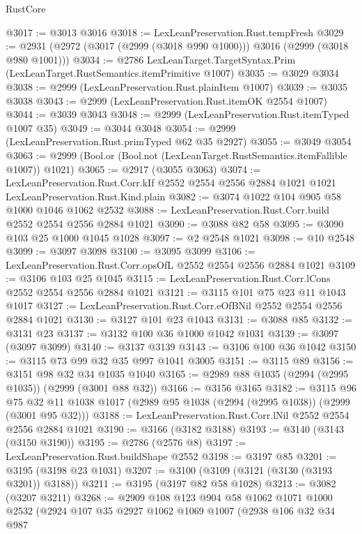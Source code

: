 \begin{lexlean}{RustCore}
\begin{coremodule}
@3017 := @3013 @3016
@3018 := LexLeanPreservation.Rust.tempFresh
@3029 := @2931 (@2972 (@3017 (@2999 (@3018 @990 @1000))) @3016 (@2999 (@3018 @980 @1001)))
@3034 := @2786 LexLeanTarget.TargetSyntax.Prim (LexLeanTarget.RustSemantics.itemPrimitive @1007)
@3035 := @3029 @3034
@3038 := @2999 (LexLeanPreservation.Rust.plainItem @1007)
@3039 := @3035 @3038
@3043 := @2999 (LexLeanPreservation.Rust.itemOK @2554 @1007)
@3044 := @3039 @3043
@3048 := @2999 (LexLeanPreservation.Rust.itemTyped @1007 @35)
@3049 := @3044 @3048
@3054 := @2999 (LexLeanPreservation.Rust.primTyped @62 @35 @2927)
@3055 := @3049 @3054
@3063 := @2999 (Bool.or (Bool.not (LexLeanTarget.RustSemantics.itemFallible @1007)) @1021)
@3065 := @2917 (@3055 @3063)
@3074 := LexLeanPreservation.Rust.Corr.kIf
    @2552
    @2554
    @2556
    @2884
    @1021
    @1021
    LexLeanPreservation.Rust.Kind.plain
@3082 := @3074 @1022 @104 @905 @58 @1000 @1046 @1062 @2532
@3088 := LexLeanPreservation.Rust.Corr.build @2552 @2554 @2556 @2884 @1021
@3090 := @3088 @82 @58
@3095 := @3090 @103 @25 @1000 @1045 @1028
@3097 := @2 @2548 @1021
@3098 := @10 @2548
@3099 := @3097 @3098
@3100 := @3095 @3099
@3106 := LexLeanPreservation.Rust.Corr.opsOfL @2552 @2554 @2556 @2884 @1021
@3109 := @3106 @103 @25 @1045
@3115 := LexLeanPreservation.Rust.Corr.lCons @2552 @2554 @2556 @2884 @1021
@3121 := @3115 @101 @75 @23 @11 @1043 @1017
@3127 := LexLeanPreservation.Rust.Corr.eOfBNil @2552 @2554 @2556 @2884 @1021
@3130 := @3127 @101 @23 @1043
@3131 := @3088 @85
@3132 := @3131 @23
@3137 := @3132 @100 @36 @1000 @1042 @1031
@3139 := @3097 (@3097 @3099)
@3140 := @3137 @3139
@3143 := @3106 @100 @36 @1042
@3150 := @3115 @73 @99 @32 @35 @997 @1041 @3005
@3151 := @3115 @89
@3156 := @3151 @98 @32 @34 @1035 @1040
@3165 := @2989 @88 @1035 (@2994 (@2995 @1035)) (@2999 (@3001 @88 @32))
@3166 := @3156 @3165
@3182 := @3115
    @96
    @75
    @32
    @11
    @1038
    @1017
    (@2989 @95 @1038 (@2994 (@2995 @1038)) (@2999 (@3001 @95 @32)))
@3188 := LexLeanPreservation.Rust.Corr.lNil @2552 @2554 @2556 @2884 @1021
@3190 := @3166 (@3182 @3188)
@3193 := @3140 (@3143 (@3150 @3190))
@3195 := @2786 (@2576 @8)
@3197 := LexLeanPreservation.Rust.buildShape @2552
@3198 := @3197 @85
@3201 := @3195 (@3198 @23 @1031)
@3207 := @3100 (@3109 (@3121 (@3130 (@3193 @3201)) @3188))
@3211 := @3195 (@3197 @82 @58 @1028)
@3213 := @3082 (@3207 @3211)
@3268 := @2909
    @108
    @123
    @904
    @58
    @1062
    @1071
    @1000
    @2532
    (@2924
      @107
      @35
      @2927
      @1062
      @1069
      @1007
      (@2938
        @106
        @32
        @34
        @987

\end{coremodule}
\end{lexlean}
